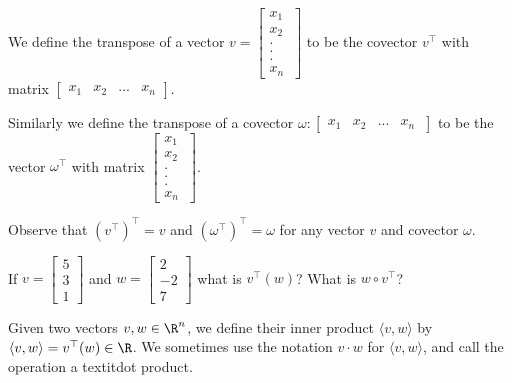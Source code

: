 \begin{definition}
	We define the transpose of a vector $v = \begin{bmatrix} x_1 \\x_2\\ .\\.\\. \\ x_n\ \end{bmatrix}$ to be the covector $v^\top$ with matrix 
	$\begin{bmatrix} x_1 &x_2& ... &x_n \end{bmatrix}$.
	
	Similarly we define the transpose of a covector $\omega: \begin{bmatrix} x_1 &x_2& ... &x_n\ \end{bmatrix}$ to be the vector $\omega^\top$ with matrix
	$\begin{bmatrix} x_1 \\x_2\\ .\\.\\. \\ x_n\ \end{bmatrix}$.  
\end{definition}

Observe that $(v^\top)^\top = v$ and $(\omega^\top)^\top = \omega$ for any vector $v$ and covector $\omega$.

\begin{question}
	If $v = \begin{bmatrix}  5 \\ 3 \\ 1\end{bmatrix}$ and $w = \begin{bmatrix}  2 \\ -2 \\ 7\end{bmatrix}$ what is $v^\top(w)$? What is $w \circ v^\top$?
\end{question}

\begin{definition}
	Given two vectors $v,w \in \R^n$, we define their inner product $\langle v, w\rangle$ by $\langle v,w \rangle = v^\top(w) \in \R$.  We sometimes use the notation 
	$v \cdot w$ for $\langle v , w \rangle$, and call the operation a textit{dot product}. 
\end{definition}



